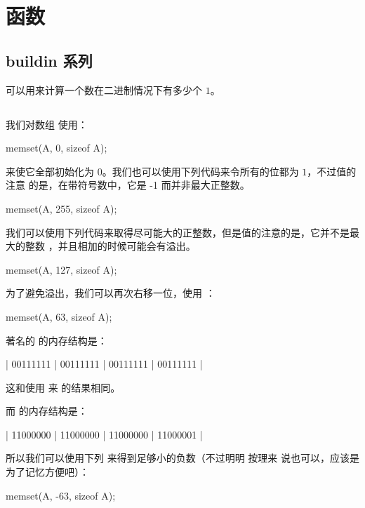 \section{函数}



\subsection{buildin 系列}
 可以用来计算一个数在二进制情况下有多少个 $1$。



\subsection{\protect{}} \label{sec:memset的使用} \label{subsec:memset}
我们对数组  使用：
\begin{Cpp}
memset(A, 0, sizeof A);
\end{Cpp}

来使它全部初始化为 $0$。我们也可以使用下列代码来令所有的位都为 $1$，不过值的注意
的是，在带符号数中，它是 -1 而并非最大正整数。
\begin{Cpp}
memset(A, 255, sizeof A);
\end{Cpp}

我们可以使用下列代码来取得尽可能大的正整数，但是值的注意的是，它并不是最大的整数
，并且相加的时候可能会有溢出。
\begin{Cpp}
memset(A, 127, sizeof A);
\end{Cpp}

为了避免溢出，我们可以再次右移一位，使用 ：
\begin{Cpp}
memset(A, 63, sizeof A);
\end{Cpp}

著名的  的内存结构是：
\begin{Cpp}
| 00111111 | 00111111 | 00111111 | 00111111 |
\end{Cpp}

这和使用  来  的结果相同。

而  的内存结构是：
\begin{Cpp}
| 11000000 | 11000000 | 11000000 | 11000001 |
\end{Cpp}

所以我们可以使用下列  来得到足够小的负数（不过明明  按理来
说也可以，应该是为了记忆方便吧）：
\begin{Cpp}
memset(A, -63, sizeof A);
\end{Cpp}




